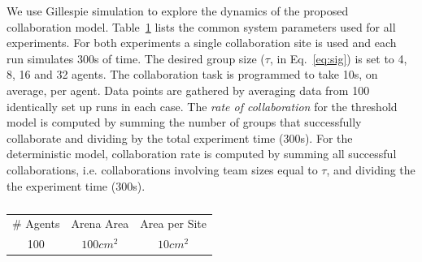 \documentclass{TeXstyles/DARS/svmult}  %
\begin{document}
We use Gillespie simulation \cite{gillespie76} to explore the dynamics of the proposed collaboration model.
Table~\ref{tab:params} lists the common system parameters used for all experiments. For both experiments a single collaboration site is used and each run simulates 300s of time. The desired group size ($\tau$, in Eq.~\eqref{eq:sig}) is set to 4, 8, 16 and 32 agents. The collaboration task is programmed to take 10s, on average, per agent. Data points are gathered by averaging data from 100 identically set up runs in each case. The \emph{rate of collaboration} for the threshold model is computed by summing the number of groups that successfully collaborate and dividing by the total experiment time (300s). For the deterministic model, collaboration rate is computed by summing all successful collaborations, i.e. collaborations involving team sizes equal to $\tau$, and dividing the the experiment time (300s).

\begin{table}
\centering\begin{tabular}{|c|c|c|}
\hline
\# Agents & Arena Area & Area per Site\\
100 & $100cm^2$ & $10cm^2$\\
\hline
\end{tabular}
\centering\caption{}\label{tab:params}
\end{table}



\end{document}
